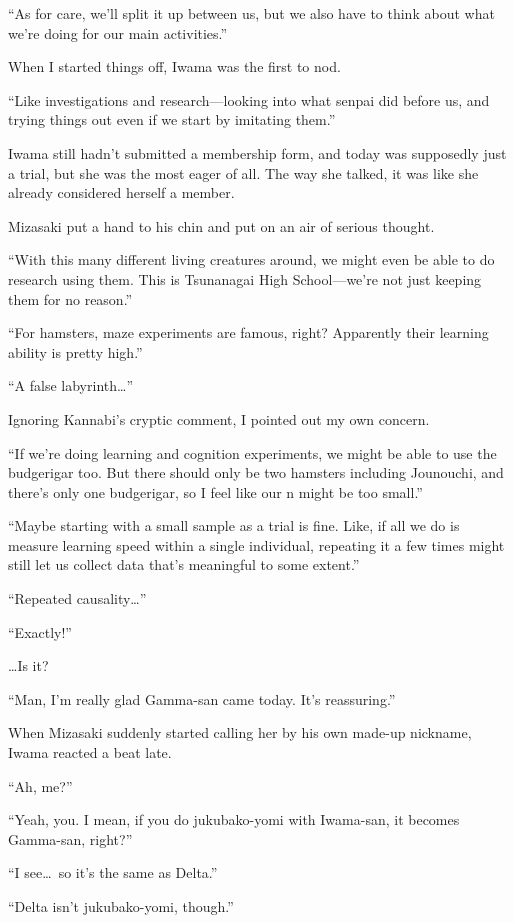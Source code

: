 \documentclass[
    a4paper,
    12pt,
    twoside,
    openany,
    UTF8,
    fontset=windows
]{ctexbook}
\begin{document}
``As for care, we'll split it up between us, but we also have to think about what we're doing for our main activities.''

When I started things off, Iwama was the first to nod.

``Like investigations and research---looking into what senpai did before us, and trying things out even if we start by imitating them.''

Iwama still hadn't submitted a membership form, and today was supposedly just a trial, but she was the most eager of all. The way she talked, it was like she already considered herself a member.

Mizasaki put a hand to his chin and put on an air of serious thought.

``With this many different living creatures around, we might even be able to do research using them. This is Tsunanagai High School---we're not just keeping them for no reason.''

``For hamsters, maze experiments are famous, right? Apparently their learning ability is pretty high.''

``A false labyrinth\dots''

Ignoring Kannabi's cryptic comment, I pointed out my own concern.

``If we're doing learning and cognition experiments, we might be able to use the budgerigar too. But there should only be two hamsters including Jounouchi, and there's only one budgerigar, so I feel like our n might be too small.''

``Maybe starting with a small sample as a trial is fine. Like, if all we do is measure learning speed within a single individual, repeating it a few times might still let us collect data that's meaningful to some extent.''

``Repeated causality\dots''

``Exactly!''

\dots Is it?

``Man, I'm really glad Gamma-san came today. It's reassuring.''

When Mizasaki suddenly started calling her by his own made-up nickname, Iwama reacted a beat late.

``Ah, me?''

``Yeah, you. I mean, if you do jukubako-yomi with Iwama-san, it becomes Gamma-san, right?''

``I see\dots\ so it's the same as Delta.''

``Delta isn't jukubako-yomi, though.''
\end{document}
